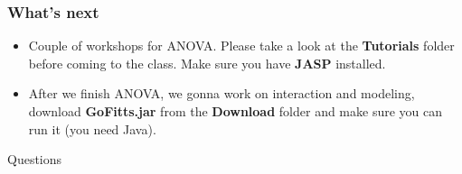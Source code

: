 \documentclass{beamer}
\begin{document}




\begin{frame}
\frametitle{What's next}
	\begin{itemize}
		\item Couple of workshops for ANOVA.  Please take a look at the \textbf{Tutorials} folder before coming to the class.   Make sure you have \textbf{JASP} installed.
		\item After we finish ANOVA, we gonna work on interaction and modeling,  download \textbf{GoFitts.jar} from the \textbf{Download} folder and make sure you can run it (you need Java).
	\end{itemize}
\end{frame}

\begin{frame}
\Huge{\centerline{Questions}}
\end{frame}

\end{document}
